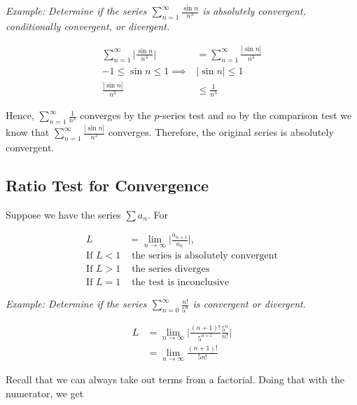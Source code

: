         \noindent \color{blue} \textit{Example: Determine if the series $\sum^\infty_{n=1}
        \frac{\sin{n}}{n^3}$ is absolutely convergent, conditionally convergent, or divergent.}
        \color{black}

        \begin{align*}
            \sum^\infty_{n=1}\Bigg|\frac{\sin{n}}{n^3}\Bigg| &= \sum^\infty_{n=1}\frac{|\sin{n}|}{n^3} \\
            -1\leq\sin{n}\leq 1     \implies                 &  |\sin{n}|\leq 1 \\
            \frac{|\sin{n}|}{n^3}                            &\leq \frac{1}{n^3}
        \end{align*}

        \noindent Hence, $\sum^\infty_{n=1}\frac{1}{n^3}$ converges by the $p$-series test and so by
        the comparison test we know that $\sum^\infty_{n=1}\frac{|\sin{n}|}{n^3}$ converges.
        Therefore, the original series is absolutely convergent.


    \subsection{Ratio Test for Convergence}
        Suppose we have the series $\sum a_n$. For

        \begin{align*}
            L    &= \lim_{n\to\infty}\Bigg|\frac{a_{n+1}}{a_n}\Bigg|, \\
            \text{If } L<1 & \text{ the series is absolutely convergent} \\
            \text{If } L>1 & \text{ the series diverges} \\
            \text{If } L=1 & \text{ the test is inconclusive}
        \end{align*}

        \noindent \color{blue} \textit{Example: Determine if the series $\sum^\infty_{n=0}
        \frac{n!}{5^n}$ is convergent or divergent.} \color{black}

        \begin{align*}
            L   &= \lim_{n\to\infty}\Bigg|\frac{(n+1)!}{5^{n+1}}\frac{5^n}{n!}\Bigg| \\
                &= \lim_{n\to\infty}\frac{(n+1)!}{5n!}
        \end{align*}

        \pagebreak
        \noindent Recall that we can always take out terms from a factorial. Doing that with the
        numerator, we get


